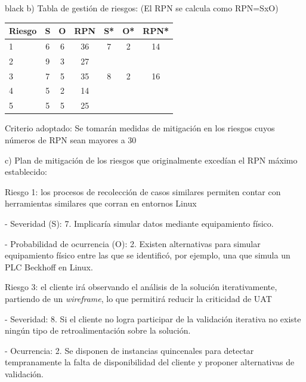 \documentclass[11pt]{charter}
\begin{document}
\begin{consigna}{black}
b) Tabla de gestión de riesgos:      (El RPN se calcula como RPN=SxO)

\begin{table}[htpb]
\centering
\begin{tabularx}{\linewidth}{@{}|X|c|c|c|c|c|c|@{}}
\hline
\rowcolor[HTML]{C0C0C0} 
Riesgo & S & O & RPN & S* & O* & RPN* \\ \hline
    1   &  6 &  6 & 36    &  7  &  2  & 14     \\ \hline
    2  &  9 &  3 &   27  &    &    &      \\ \hline
    3  &  7 &  5 &   35  &  8  &  2  & 16     \\ \hline
    4  &  5 &  2 &   14  &    &    &      \\ \hline
    5  &  5 &  5 &   25  &    &    &      \\ \hline
\end{tabularx}%
\end{table}

Criterio adoptado: 
Se tomarán medidas de mitigación en los riesgos cuyos números de RPN sean mayores a 30

c) Plan de mitigación de los riesgos que originalmente excedían el RPN máximo establecido:
 
Riesgo 1: los procesos de recolección de casos similares permiten contar con herramientas similares que corran en entornos Linux  

  - Severidad (S): 7. Implicaría simular datos mediante equipamiento físico.
  
  - Probabilidad de ocurrencia (O): 2. Existen alternativas para simular equipamiento físico entre las que se identificó, por ejemplo, una que simula un PLC Beckhoff en Linux.

Riesgo 3: el cliente irá observando el análisis de la solución iterativamente, partiendo de un \textit{wireframe}, lo que permitirá reducir la criticidad de UAT

- Severidad: 8. Si el cliente no logra participar de la validación iterativa no existe ningún tipo de retroalimentación sobre la solución.

- Ocurrencia: 2. Se disponen de instancias quincenales para detectar tempranamente la falta de disponibilidad del cliente y proponer alternativas de validación.
 
\end{consigna}
\end{document}
